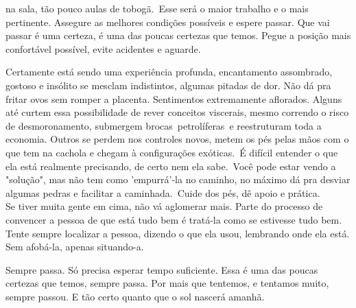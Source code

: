 na sala, tão pouco aulas de tobogã. Esse será o maior trabalho e o mais pertinente. Assegure as melhores condições possíveis e
espere passar. Que vai passar é uma certeza, é uma das poucas certezas que temos. Pegue a posição mais confortável possível,
evite acidentes e aguarde.\\
\par
\indent Certamente está sendo uma experiência profunda, encantamento assombrado, gostoso e insólito se mesclam indistintos,
algumas pitadas de dor. Não dá pra fritar ovos sem romper a placenta. Sentimentos extremamente aflorados. Alguns até curtem essa
possibilidade de rever conceitos viscerais, mesmo correndo o risco de desmoronamento, submergem brocas petrolíferas e
reestruturam toda a economia. Outros se perdem nos controles novos, metem os pés pelas mãos com o que tem na cachola e chegam à
configurações exóticas. É difícil entender o que ela está realmente precisando, de certo nem ela sabe. Você pode estar vendo a
"solução", mas não tem como 'empurrá'-la no caminho, no máximo dá pra desviar algumas pedras e facilitar a caminhada. Cuide dos
pés, dê apoio e prática.\\
\noindent Se tiver muita gente em cima, não vá aglomerar mais. Parte do processo de convencer a pessoa de que está tudo bem é
tratá-la como se estivesse tudo bem.
Tente sempre localizar a pessoa, dizendo o que ela usou, lembrando onde ela está. Sem afobá-la, apenas situando-a.\\
\par
\indent Sempre passa. Só precisa esperar tempo suficiente. Essa é uma das poucas certezas que temos, sempre passa. Por mais que
tentemos, e tentamos muito, sempre passou. E tão certo quanto que o sol nascerá amanhã.
%
%
%
%

%
%
%
